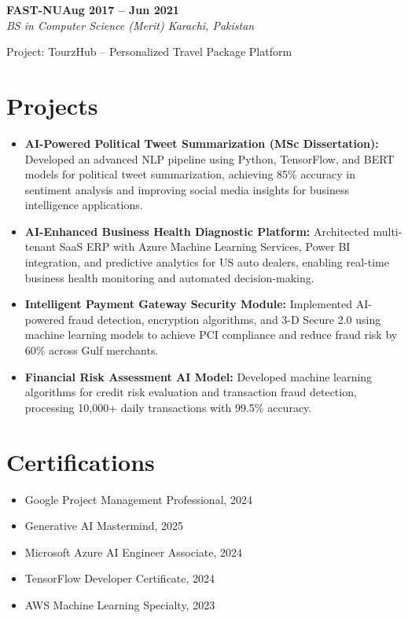 \documentclass[letterpaper,10pt]{article}
\newcommand{\headingBf}[2]{
  \hspace{10pt}\textbf{#1}\hfill\textbf{#2}\\
}
\newcommand{\headingIt}[2]{
  \hspace{10pt}\textit{#1}\hfill\textit{#2}\\
}
\newenvironment{resume_list}{
  \vspace{-7pt}
  \begin{itemize}[itemsep=-2px, parsep=1pt, leftmargin=30pt]
}{
  \end{itemize}
}
\begin{document}
\headingBf{FAST-NU}{Aug 2017 -- Jun 2021}
\headingIt{BS in Computer Science (Merit) \hfill Karachi, Pakistan}{}
\begin{resume_list}
    \item Project: TourzHub -- Personalized Travel Package Platform
\end{resume_list}

\section{Projects}
\begin{itemize}
    \setlength\itemsep{3pt}
    \item \textbf{AI-Powered Political Tweet Summarization (MSc Dissertation):} Developed an advanced NLP pipeline using Python, TensorFlow, and BERT models for political tweet summarization, achieving 85\% accuracy in sentiment analysis and improving social media insights for business intelligence applications.
    \item \textbf{AI-Enhanced Business Health Diagnostic Platform:} Architected multi-tenant SaaS ERP with Azure Machine Learning Services, Power BI integration, and predictive analytics for US auto dealers, enabling real-time business health monitoring and automated decision-making.
    \item \textbf{Intelligent Payment Gateway Security Module:} Implemented AI-powered fraud detection, encryption algorithms, and 3-D Secure 2.0 using machine learning models to achieve PCI compliance and reduce fraud risk by 60\% across Gulf merchants.
    \item \textbf{Financial Risk Assessment AI Model:} Developed machine learning algorithms for credit risk evaluation and transaction fraud detection, processing 10,000+ daily transactions with 99.5\% accuracy.
\end{itemize}

\section{Certifications}
\begin{itemize}
    \item Google Project Management Professional, 2024
    \item Generative AI Mastermind, 2025
    \item Microsoft Azure AI Engineer Associate, 2024
    \item TensorFlow Developer Certificate, 2024
    \item AWS Machine Learning Specialty, 2023
\end{itemize}

\vspace*{\fill}
\end{document}
